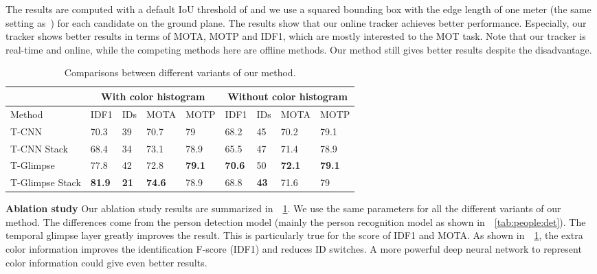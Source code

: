 \documentclass{article}
\begin{document}
The results are computed with a default IoU threshold of  and we use a squared bounding box with the edge length of one meter (the same setting as~\cite{chavdarova2018wildtrack}) for each candidate on the ground plane.
The results show that our online tracker achieves better performance. 
Especially, our tracker
shows better results in terms of MOTA, MOTP and IDF1, which are mostly interested to the MOT task.
Note that our tracker is real-time and online, while the competing methods here are offline
methods. Our method still gives better results despite the disadvantage.



\begin{table}
	\begin{center}
		\caption{Comparisons between different variants of our method. }
		\label{tab:tracking:wlablation}
		\begin{tabular}{l|p{0.4cm}p{0.4cm}p{0.7cm}p{0.8cm}|p{0.4cm}p{0.4cm}p{0.7cm}p{0.8cm}}
			\hline
			&\multicolumn{4}{c}{With color histogram} & \multicolumn{4}{|c}{Without color histogram} \\ \hline
Method	&	IDF1	&	IDs	&	MOTA	&	MOTP&	IDF1	&	IDs	&	MOTA	&	MOTP	\\ \hline
T-CNN	&	70.3	&	39	&	70.7	&	79&	68.2	&	45	&	70.2	&	79.1	\\
T-CNN Stack	&	68.4	&	34	&	73.1	&	78.9&	65.5	&	47	&	71.4	&	78.9	\\
T-Glimpse	&	77.8	&	42	&	72.8	&	\textbf{79.1}&	\textbf{70.6}	&	50	&	\textbf{72.1}	&	\textbf{79.1}	\\
T-Glimpse Stack	&	\textbf{81.9}	&	\textbf{21}	&	\textbf{74.6}	&	78.9&	68.8	&	\textbf{43}	&	71.6	&	79	\\ \hline
		\end{tabular}
	\end{center}
	
\end{table}

\textbf{Ablation study} Our ablation study results are summarized in~\tablename~{\ref{tab:tracking:wlablation}}. 
We use the same parameters for all the different variants of our method. 
The differences come from
the person detection model (mainly the person recognition model as shown in~\tablename{~\ref{tab:people:det}}). The temporal glimpse layer greatly improves the result. This is particularly true for the score of IDF1 and MOTA.  As shown in~\tablename~{\ref{tab:tracking:wlablation}}, 
the extra color information improves the identification F-score (IDF1) and reduces ID switches.
A more powerful deep neural network to represent color information could give even better results.
\end{document}
